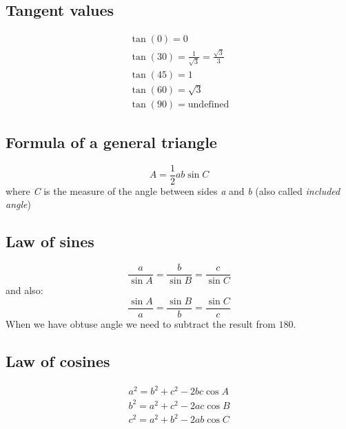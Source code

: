 \documentclass{article}
\begin{document}

\subsection{Tangent values}
\begin{equation}
  \begin{gathered}
    \tan(0) = 0 \\
    \tan(30) = \frac{1}{\sqrt{3}} = \frac{\sqrt{3}}{3} \\
    \tan(45) = 1 \\
    \tan(60) = \sqrt{3} \\
    \tan(90) = \text{undefined}
  \end{gathered}
\end{equation}

\subsection{Formula of a general triangle}

\begin{equation}
  A = \frac{1}{2}ab \sin{C}
\end{equation}
where \textit{C} is the measure of the angle between sides \textit{a} and \textit{b} (also called \textit{included angle})

\subsection{Law of sines}

\begin{equation}
  \frac{a}{\sin A} = \frac{b}{\sin B} = \frac{c}{\sin C}
\end{equation}
and also:
\begin{equation}
  \frac{\sin A}{a} = \frac{\sin B}{b} = \frac{\sin C}{c}
\end{equation}
When we have obtuse angle we need to subtract the result from $180$.

\subsection{Law of cosines}
\begin{equation}
  \begin{gathered}
    a^2 = b^2 + c^2 - 2bc\cos{A} \\
    b^2 = a^2 + c^2 - 2ac\cos{B} \\
    c^2 = a^2 + b^2 - 2ab\cos{C}
  \end{gathered}
\end{equation}
\end{document}
